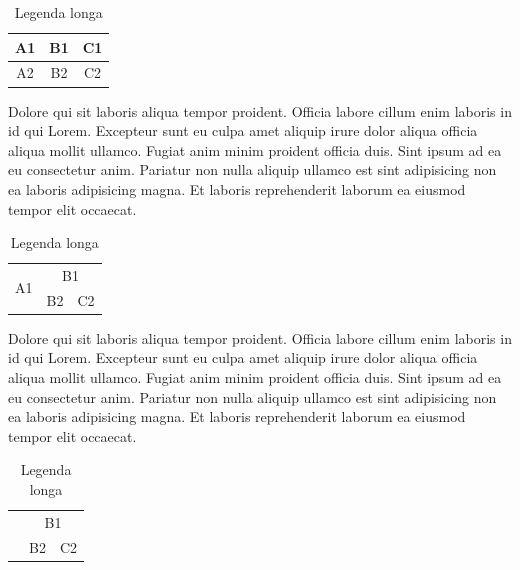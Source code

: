 \documentclass[12pt]{report}
\begin{document}
\begin{table}[H]
    \centering
    \caption[Legenda curta]{Legenda longa}
    \label{tab:tab1}
    \begin{tabular}{|c|c|c|}
        \hline
        A1 & B1 & C1 \\ \hline
        A2 & B2 & C2 \\ \hline
    \end{tabular}
\end{table}

Dolore qui sit laboris aliqua tempor proident. Officia labore cillum enim laboris in id qui Lorem. Excepteur sunt eu culpa amet aliquip irure dolor aliqua officia aliqua mollit ullamco. Fugiat anim minim proident officia duis. Sint ipsum ad ea eu consectetur anim. Pariatur non nulla aliquip ullamco est sint adipisicing non ea laboris adipisicing magna. Et laboris reprehenderit laborum ea eiusmod tempor elit occaecat.

\renewcommand{\arraystretch}{2}
\begin{table}[H]
    \centering
    \caption[Legenda curta]{Legenda longa}
    \label{tab:tab2}
    \begin{tabular}{|c|c|c|}
        \hline
        \multirow{2}{*}{A1} & \multicolumn{2}{c|}{B1}      \\ \cline{2-3}
        & B2                      & C2 \\ \hline
    \end{tabular}
\end{table}

Dolore qui sit laboris aliqua tempor proident. Officia labore cillum enim laboris in id qui Lorem. Excepteur sunt eu culpa amet aliquip irure dolor aliqua officia aliqua mollit ullamco. Fugiat anim minim proident officia duis. Sint ipsum ad ea eu consectetur anim. Pariatur non nulla aliquip ullamco est sint adipisicing non ea laboris adipisicing magna. Et laboris reprehenderit laborum ea eiusmod tempor elit occaecat.

\renewcommand{\arraystretch}{2}
\begin{table}[H]
    \centering
    \caption[Legenda curta]{Legenda longa}
    \label{tab:tab3}
    \begin{tabularx}{0.5\textwidth}{|X|X|X|}
        \hline
        \centering \multirow{2}{*}{A1} & \multicolumn{2}{c|}{B1}      \\ \cline{2-3}
                                       & B2                      & C2 \\ \hline
    \end{tabularx}
\end{table}
\end{document}
